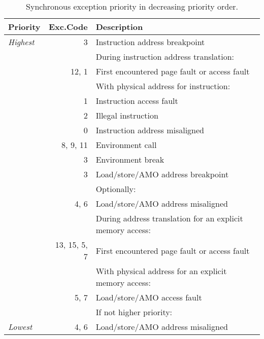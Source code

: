 \begin{table*}[htbp]
\begin{center}
\begin{tabular}{|l|r|l|}
  \hline
  Priority      & Exc.\@ Code & Description \\
  \hline
  {\em Highest} &          3 & Instruction address breakpoint \\
  \hline
                &            & During instruction address translation: \\
                &      12, 1 & \quad First encountered page fault or
                                 access fault \\
  \hline
                &            & With physical address for instruction: \\
                &          1 & \quad Instruction access fault \\
  \hline
                &          2 & Illegal instruction \\
                &          0 & Instruction address misaligned \\
                &   8, 9, 11 & Environment call \\
                &          3 & Environment break \\
                &          3 & Load/store/AMO address breakpoint \\
  \hline
                &            & Optionally: \\
                &       4, 6 & \quad Load/store/AMO address misaligned \\
  \hline
                &            & During address translation for an explicit
                                 memory access: \\
              & 13, 15, 5, 7 & \quad First encountered page fault or
                                 access fault \\
  \hline
                &            & With physical address for an explicit
                                 memory access: \\
                &       5, 7 & \quad Load/store/AMO access fault \\
  \hline
                &            & If not higher priority: \\
  {\em Lowest}  &       4, 6 & \quad Load/store/AMO address misaligned \\
  \hline

\end{tabular}
\end{center}
\caption{Synchronous exception priority in decreasing priority order.}
\label{exception-priority}
\end{table*}

